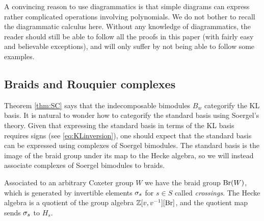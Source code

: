 
A convincing reason to use diagrammatics is that simple diagrams can express rather complicated operations involving polynomials. We do not bother to recall the diagrammatic calculus
here. Without any knowledge of diagrammatics, the reader should still be able to follow all the proofs in this paper (with fairly easy and
believable exceptions), and will only suffer by not being able to follow some examples.



\subsection{Braids and Rouquier complexes}
\label{subsec:Rouq}


Theorem \ref{thm:SC} says that the indecomposable bimodules $B_w$ categorify the KL basis. It is natural to wonder how to categorify the standard basis using Soergel's theory. Given that expressing the standard basis in terms of the KL basis requires signs (see \eqref{eq:KLinversion}), one should expect that the standard basis can be expressed using complexes of Soergel bimodules. The standard basis is the image of the braid group under its map to the Hecke algebra, so we will instead associate complexes of Soergel bimodules to braids.

Associated to an arbitrary Coxeter group $W$ we have the braid group $\operatorname{Br}(W)$, which is generated by invertible elements $\sigma_s$ for $s \in S$ called \emph{crossings}.  The Hecke algebra is a quotient of the group algebra ${\mathbb{Z}}[v,v^{-1}] [\operatorname{Br}]$, and the quotient map sends $\sigma_s$ to $H_{s}$.

